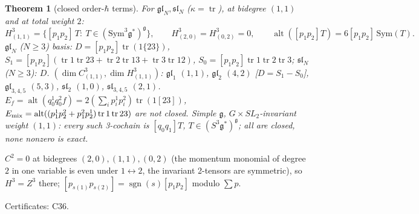 \documentclass[10pt,a4paper]{article}
\numberwithin{equation}{section}
\newtheorem{theorem}{Theorem}[section]
\theoremstyle{definition}
\theoremstyle{remark}
\newcommand{\tr}{\operatorname{tr}}
\newcommand{\alt}{\operatorname{alt}}
\newcommand{\sgn}{\operatorname{sgn}}
\newcommand{\g}{\mathfrak g}
\newcommand{\fsl}{\mathfrak{sl}}
\newcommand{\fgl}{\mathfrak{gl}}
\newcommand{\cert}[1]{\par\noindent\textup{Certificates: #1.}\par}
\begin{document}
\begin{theorem}[closed order-$\hbar$ terms]\label{thm-H3}
For $\fgl_N,\fsl_N$ ($\kappa=\tr$), at bidegree $(1,1)$ and at total weight $2$:
\begin{equation}
H^3_{(1,1)}=\{[p_1p_2]\,T:\ T\in(\mathrm{Sym}^3\g^*)^\g\},\qquad H^3_{(2,0)}=H^3_{(0,2)}=0,\qquad \alt([p_1p_2]T)=6[p_1p_2]\,\mathrm{Sym}(T).
\end{equation}
$\fgl_N$ ($N\ge3$) basis: $D=[p_1p_2]\tr(1\{23\})$, $S_1=[p_1p_2](\tr1\tr23+\tr2\tr13+\tr3\tr12)$, $S_0=[p_1p_2]\tr1\tr2\tr3$; $\fsl_N$ ($N\ge3$): $D$. $(\dim C^3_{(1,1)},\dim H^3_{(1,1)})$: $\fgl_1$ $(1,1)$, $\fgl_2$ $(4,2)$ [$D=S_1-S_0$], $\fgl_{3,4,5}$ $(5,3)$, $\fsl_2$ $(1,0)$, $\fsl_{3,4,5}$ $(2,1)$. $E_f=\alt(q_0^1q_0^2f)=2(\sum_ip^1_ip^2_i)\tr(1[23])$, $E_{\rm mix}=\alt((p^1_1p^2_2+p^2_1p^1_2)\tr1\tr23)$ are not closed.
Simple $\g$, $G\times SL_2$-invariant weight $(1,1)$: every such 3-cochain is $[q_0q_1]T$, $T\in(S^3\g^*)^\g$; all are closed, none nonzero is exact.
\end{theorem}
$C^2=0$ at bidegrees $(2,0),(1,1),(0,2)$ (the momentum monomial of degree $2$ in one variable is even under $1\leftrightarrow2$, the invariant 2-tensors are symmetric), so $H^3=Z^3$ there; $[p_{s(1)}p_{s(2)}]=\sgn(s)[p_1p_2]$ modulo $\sum p$.
\cert{C36}
\end{document}

